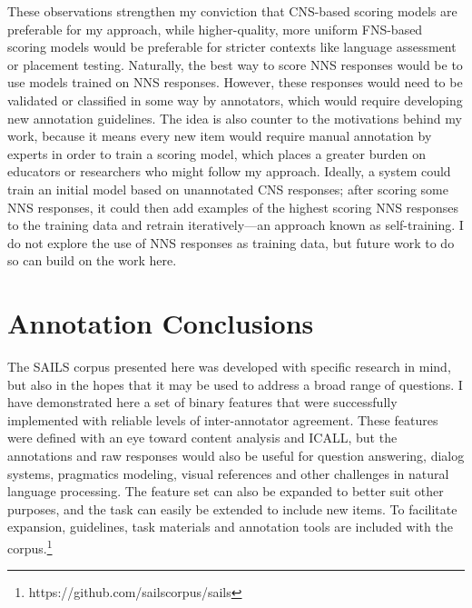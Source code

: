 These observations strengthen my conviction that CNS-based scoring models are preferable for my approach, while higher-quality, more uniform FNS-based scoring models would be preferable for stricter contexts like language assessment or placement testing. Naturally, the best way to score NNS responses would be to use models trained on NNS responses. However, these responses would need to be validated or classified in some way by annotators, which would require developing new annotation guidelines. The idea is also counter to the motivations behind my work, because it means every new item would require manual annotation by experts in order to train a scoring model, which places a greater burden on educators or researchers who might follow my approach. Ideally, a system could train an initial model based on unannotated CNS responses; after scoring some NNS responses, it could then add examples of the highest scoring NNS responses to the training data and retrain iteratively---an approach known as self-training. I do not explore the use of NNS responses as training data, but future work to do so can build on the work here.




\section{Annotation Conclusions}
\label{sec:annotation-conclusions}

The SAILS corpus presented here was developed with specific research in mind, but also in the hopes that it may be used to address a broad range of questions. I have demonstrated here a set of binary features that were successfully implemented with reliable levels of inter-annotator agreement. These features were defined with an eye toward content analysis and ICALL, but the annotations and raw responses would also be useful for question answering, dialog systems, pragmatics modeling, visual references and other challenges in natural language processing. The feature set can also be expanded to better suit other purposes, and the task can easily be extended to include new items. To facilitate expansion, guidelines, task materials and annotation tools are included with the corpus.\footnote{https://github.com/sailscorpus/sails}

